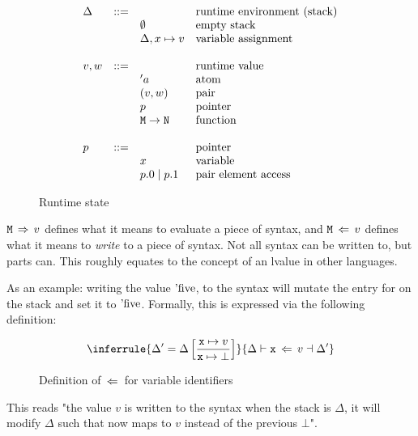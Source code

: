\documentclass[12pt,twoside]{report}
\begin{document}
\begin{figure}[H]
  \arraycolsep=1pt %
  \centering

  \vspace{-2ex} %
  \[
  \begin{array}[t]{llll}
    \Delta & ::= & & \text{runtime environment (stack)} \\
    && \emptyset & \text{empty stack} \\
    && \Delta, x \mapsto v & \text{variable assignment} \\
    \\
    v, w & ::= & & \text{runtime value} \\
    && 'a & \text{atom} \\
    && (v, w) & \text{pair} \\
    && p & \text{pointer} \\
    && \mono{M} \rightarrow \mono{N} & \text{function} \\
    \\
    p & ::= & & \text{pointer} \\
    && x & \text{variable} \\
    && p.0 \mid p.1 & \text{pair element access} \\
  \end{array} %
  \]
\caption{Runtime state} %
\label{fig:stack} %
\end{figure} %

$\text{\texttt{M}} \,\Rightarrow\, v$ defines what it means to evaluate a piece of syntax, and $\text{\texttt{M}} \,\Leftarrow\, v$ defines what it means to \textit{write} to a piece of syntax. Not all syntax can be written to, but parts can. This roughly equates to the concept of an lvalue in other languages.

As an example: writing the value $\text{'five}$, to the syntax  will mutate the entry for  on the stack and set it to $\text{'five}$. Formally, this is expressed via the following definition:

\begin{figure}[H]
  \begin{gather*}
    \inferrule{
      \Delta' = \Delta\left[\dfrac{\mono{x} \mapsto v}{\mono{x} \mapsto \bot}\right]
    }{
      \Delta \vdash \mono{x} \ewritearrow v \dashv \Delta'
    }
  \end{gather*}
  \caption{Definition of $\,\Leftarrow\,$ for variable identifiers}
\end{figure}

This reads "the value $v$ is written to the syntax  when the stack is $\Delta$, it will modify $\Delta$ such that  now maps to $v$ instead of the previous $\bot$".
\end{document}
